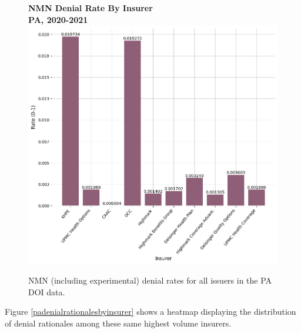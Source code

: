 \documentclass[12pt, a4paper,twoside,parskip=full]{report}
\theoremstyle{plain} %
\theoremstyle{definition} %
\theoremstyle{remark} %
\numberwithin{equation}{chapter}
\begin{document}
		\clearpage
		
		\begin{figure}[h!]
			\centering
			\textbf{NMN Denial Rate By Insurer}\\
			\textbf{PA, 2020-2021}\\
			\includegraphics[width=\columnwidth]{images/pa_claims/nmn_denial_rate_by_insurer.png}
			\caption{NMN (including experimental) denial rates for all issuers in the PA DOI data.}
			\label{painsurernmndenialrates}
		\end{figure}
		
		
		Figure \ref{padenialrationalesbyinsurer} shows a heatmap displaying the distribution of denial rationales among these same highest volume insurers.
		
\end{document}
